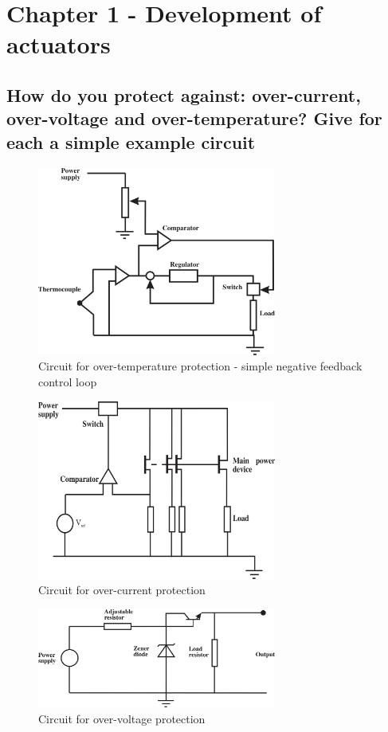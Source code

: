 \documentclass[10pt,a4paper]{article}
\begin{document}
\section{Chapter 1 - Development of actuators}

\subsection{How do you protect against: over-current, over-voltage and over-temperature? Give for each a simple example circuit}

\begin{figure}[h!]
	\centering
	\includegraphics[width=0.7\textwidth]{over-temp.png}
	\caption{Circuit for over-temperature protection - simple negative feedback control loop}
\end{figure}

\begin{figure}[h!]
	\centering
	\includegraphics[width=0.7\textwidth]{over-cur.png}
	\caption{Circuit for over-current protection}
\end{figure}

\begin{figure}[h!]
	\centering
	\includegraphics[width=0.7\textwidth]{over-volt.png}
	\caption{Circuit for over-voltage protection}
\end{figure}
\end{document}

